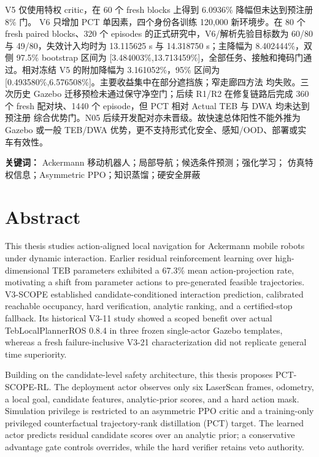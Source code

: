 \documentclass[12pt,a4paper,oneside]{report}
\begin{document}
V5 仅使用特权 critic，在 60 个 fresh blocks 上得到 6.0936\% 降幅但未达到预注册 8\% 门。
V6 只增加 PCT 单因素，四个身份各训练 120,000 新环境步。在 80 个 fresh paired blocks、320 个
episodes 的正式研究中，V6/解析先验目标数为 60/80 与 49/80，失效计入均时为 13.115625 s 与
14.318750 s；主降幅为 8.402444\%，双侧 97.5\% bootstrap 区间为
[3.484003\%,13.713459\%]，全部任务、接触和掩码门通过。相对冻结 V5 的附加降幅为
3.161052\%，95\% 区间为 [0.493580\%,6.576508\%]。主要收益集中在部分遮挡族；窄走廊四方法
均失败。三次历史 Gazebo 迁移预检未通过保守净空门；后续 R1/R2 在修复链路后完成
360 个 fresh 配对块、1440 个 episode，但 PCT 相对 Actual TEB 与 DWA 均未达到预注册
综合优势门。N05 后续开发配对亦未晋级。故快速总体阳性不能外推为 Gazebo 或一般 TEB/DWA
优势，更不支持形式化安全、感知/OOD、部署或实车有效性。

\noindent\textbf{关键词：} Ackermann 移动机器人；局部导航；候选条件预测；强化学习；
仿真特权信息；Asymmetric PPO；知识蒸馏；硬安全屏蔽

\chapter*{Abstract}
This thesis studies action-aligned local navigation for Ackermann mobile robots under dynamic
interaction. Earlier residual reinforcement learning over high-dimensional TEB parameters
exhibited a 67.3\% mean action-projection rate, motivating a shift from parameter actions to
pre-generated feasible trajectories. V3-SCOPE established candidate-conditioned interaction
prediction, calibrated reachable occupancy, hard verification, analytic ranking, and a
certified-stop fallback. Its historical V3-11 study showed a scoped benefit over actual
TebLocalPlannerROS 0.8.4 in three frozen single-actor Gazebo templates, whereas a fresh
failure-inclusive V3-21 characterization did not replicate general time superiority.

Building on the candidate-level safety architecture, this thesis proposes PCT-SCOPE-RL. The
deployment actor observes only six LaserScan frames, odometry, a local goal, candidate features,
analytic-prior scores, and a hard action mask. Simulation privilege is restricted to an
asymmetric PPO critic and a training-only privileged counterfactual trajectory-rank distillation
(PCT) target. The learned actor predicts residual candidate scores over an analytic prior; a
conservative advantage gate controls overrides, while the hard verifier retains veto authority.
\end{document}
